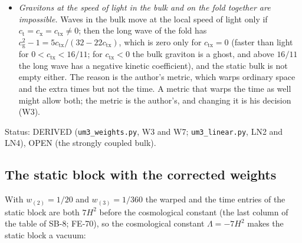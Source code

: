 \documentclass[
  10pt,
]{article}
\begin{document}
\begin{itemize}
  equation that is concentrated there has the ratio
  \((8 + 5\mathsf{A}^2 + 4\mathsf{A}_1)/(8 + 6\mathsf{A}^2)\) of its two
  coefficients (of the second derivative along the proper length of
  \(x_3\) to the second time derivative; \(\mathsf{A} = a_4'/H\) is the
  expansion rate of the fold in units of \(H\) and
  \(\mathsf{A}_1 = a_4''/H^2\) its rate of change), but it also couples
  there to the jump of its slope across the fold, at the same order
  \(\mathsf{A}^2\), so that how fast it moves follows only from the bulk
  and the fold solved together, which has not been done (OPEN;
  generically not the speed of light). Today \(\mathsf{A}\) is below
  \(10^{-30}\) for every \(H\) above \(10^{-26}\) GeV, so the effect is
  far below every measurement; in the early universe it is not small
  (W7, LN4).
\item
  \emph{Gravitons at the speed of light in the bulk and on the fold
  together are impossible.} Waves in the bulk move at the local speed of
  light only if
  \(c_{\mathrm{t}} = c_{\mathrm{x}} = c_{\mathrm{tx}} \ne 0\); then the
  long wave of the fold has
  \(c_{\mathrm{g}}^2 - 1 = 5c_{\mathrm{tx}}/(32 - 22c_{\mathrm{tx}})\),
  which is zero only for \(c_{\mathrm{tx}} = 0\) (faster than light for
  \(0 < c_{\mathrm{tx}} < 16/11\); for \(c_{\mathrm{tx}} < 0\) the bulk
  graviton is a ghost, and above \(16/11\) the long wave has a negative
  kinetic coefficient), and the static bulk is not empty either. The
  reason is the author's metric, which warps ordinary space and the
  extra times but not the time. A metric that warps the time as well
  might allow both; the metric is the author's, and changing it is his
  decision (W3).
\end{itemize}

Status: DERIVED (\texttt{um3\_weights.py}, W3 and W7;
\texttt{um3\_linear.py}, LN2 and LN4), OPEN (the strongly coupled bulk).

\hypertarget{the-static-block-with-the-corrected-weights}{%
\subsection{The static block with the corrected
weights}\label{the-static-block-with-the-corrected-weights}}

With \(w_{(2)} = 1/20\) and \(w_{(3)} = 1/360\) the warped and the time
entries of the static block are both \(7H^2\) before the cosmological
constant (the last column of the table of SB-8; FE-70), so the
cosmological constant \(\Lambda = -7H^2\) makes the static block a
vacuum:
\end{document}
